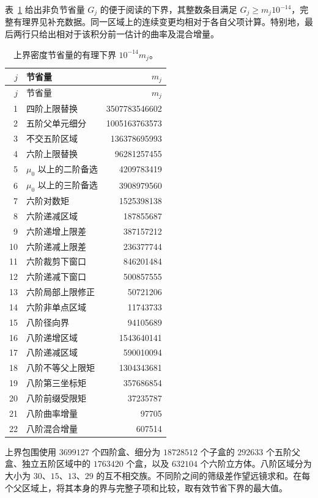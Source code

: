 表~\ref{num:upper-table} 给出非负节省量 $G_j$ 的便于阅读的下界，其整数条目满足 $G_j\ge m_j10^{-14}$，完整有理界见补充数据。同一区域上的连续变更均相对于各自父项计算。特别地，最后两行只给出相对于该积分前一估计的曲率及混合增量。

\begin{longtable}{@{}r p{} r@{}}
\caption{上界密度节省量的有理下界 $10^{-14}m_j$。}
\label{num:upper-table}\\
\toprule
$j$ & 节省量 & $m_j$\\
\midrule
\endfirsthead
\toprule $j$ & 节省量 & $m_j$\\\midrule
\endhead
1 & 四阶上限替换 & 3507783546602\\
2 & 五阶父单元细分 & 1005163763573\\
3 & 不交五阶区域 & 136378695993\\
4 & 六阶上限替换 & 96281257455\\
5 & $\mu_0$ 以上的二阶备选 & 4209783419\\
6 & $\mu_0$ 以上的三阶备选 & 3908979560\\
7 & 六阶对数矩 & 1525398138\\
8 & 六阶递减区域 & 187855687\\
9 & 六阶递增上限差 & 387157212\\
10 & 六阶递减上限差 & 236377744\\
11 & 六阶裁剪下窗口 & 846201484\\
12 & 六阶递减下窗口 & 500857555\\
13 & 六阶局部上限修正 & 50721206\\
14 & 六阶非单点区域 & 11743733\\
15 & 八阶径向界 & 94105689\\
16 & 八阶递增区域 & 1543640141\\
17 & 八阶递减区域 & 590010094\\
18 & 八阶不等父上限矩 & 1304343681\\
19 & 八阶第三坐标矩 & 357686854\\
20 & 八阶前缀受限矩 & 37235787\\
21 & 八阶曲率增量 & 97705\\
22 & 八阶混合增量 & 607514\\
\bottomrule
\end{longtable}

上界包围使用 $3699127$ 个四阶盒、细分为 $18728512$ 个子盒的 $292633$ 个五阶父盒、独立五阶区域中的 $1763420$ 个盒，以及 $632104$ 个六阶立方体。八阶区域分为大小为 $30$、$15$、$13$、$29$ 的互不相交族。不同阶之间的筛级差作望远镜求和。在每个父区域上，将其本身的界与完整子项和比较，取有效节省下界的最大值。

